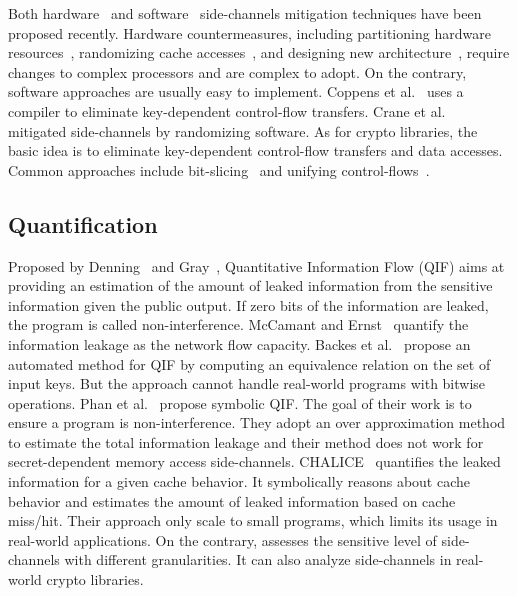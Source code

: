 Both hardware~\cite{Page2005PartitionedCA,
Wang:2007:NCD:1250662.1250723,Zhang:2015:HDL:2775054.2694372,Li:2014:SLH:2541940.2541947,
236344, 236334} and software~\cite{shih2017t,Coppens:2009:PMT:1607723.1608124,
brickell2006software,crane2015thwarting, 197207} side-channels mitigation techniques have
been proposed recently. Hardware countermeasures, including partitioning hardware resources~\cite{Page2005PartitionedCA}, randomizing cache
accesses~\cite{Wang:2007:NCD:1250662.1250723, 236344}, and designing new
architecture~\cite{tiwari2011crafting}, require changes to complex processors and are complex to adopt. On the contrary, software approaches are
usually easy to implement. Coppens et
al.~\cite{Coppens:2009:PMT:1607723.1608124} uses a compiler
to eliminate key-dependent control-flow transfers. Crane et
al.~\cite{crane2015thwarting} mitigated side-channels by randomizing software.
As for crypto libraries, the basic idea is to eliminate key-dependent
control-flow transfers and data accesses. Common approaches include
bit-slicing~\cite{konighofer2008fast,rebeiro2006bitslice} and unifying
control-flows~\cite{Coppens:2009:PMT:1607723.1608124}.

\subsection{Quantification}

Proposed by Denning~\cite{robling1982cryptography} and Gray~\cite{gray1992toward}, 
Quantitative Information Flow (QIF) aims at providing an estimation of the amount of leaked
information from the sensitive information given the public output. If zero bits
of the information are leaked, the program is called non-interference. McCamant
and Ernst~\cite{McCamantE2008} quantify the information leakage as the network
flow capacity. Backes et al.~\cite{5207642} propose an automated method for QIF
by computing an equivalence relation on the set of input keys. But the approach
cannot handle real-world programs with bitwise operations. 
Phan et al.~\cite{Phan:2012:SQI:2382756.2382791} propose symbolic QIF. The goal of their
work is to ensure a program is non-interference. They adopt an over
approximation method to estimate the total information leakage and their method
does not work for secret-dependent memory access side-channels.
CHALICE~\cite{Chattopadhyay:2017:QIL:3127041.3127044} quantifies the leaked
information for a given cache behavior. 
It symbolically reasons about cache
behavior and estimates the amount of leaked information based on cache miss/hit.
Their approach only scale to small programs, which limits its usage in
real-world applications. On the contrary, \tool{} assesses the sensitive level
of side-channels with different granularities. It can also analyze side-channels
in real-world crypto libraries.

